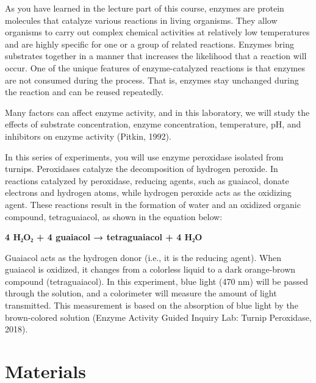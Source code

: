 \documentclass[
  letterpaper,
  DIV=11,
  numbers=noendperiod]{scrreprt}
\begin{document}
As you have learned in the lecture part of this course, enzymes are
protein molecules that catalyze various reactions in living organisms.
They allow organisms to carry out complex chemical activities at
relatively low temperatures and are highly specific for one or a group
of related reactions. Enzymes bring substrates together in a manner that
increases the likelihood that a reaction will occur. One of the unique
features of enzyme-catalyzed reactions is that enzymes are not consumed
during the process. That is, enzymes stay unchanged during the reaction
and can be reused repeatedly.

Many factors can affect enzyme activity, and in this laboratory, we will
study the effects of substrate concentration, enzyme concentration,
temperature, pH, and inhibitors on enzyme activity (Pitkin, 1992).

In this series of experiments, you will use enzyme peroxidase isolated
from turnips. Peroxidases catalyze the decomposition of hydrogen
peroxide. In reactions catalyzed by peroxidase, reducing agents, such as
guaiacol, donate electrons and hydrogen atoms, while hydrogen peroxide
acts as the oxidizing agent. These reactions result in the formation of
water and an oxidized organic compound, tetraguaiacol, as shown in the
equation below:

\textbf{4 H₂O₂ + 4 guaiacol → tetraguaiacol + 4 H₂O}

Guaiacol acts as the hydrogen donor (i.e., it is the reducing agent).
When guaiacol is oxidized, it changes from a colorless liquid to a dark
orange-brown compound (tetraguaiacol). In this experiment, blue light
(470 nm) will be passed through the solution, and a colorimeter will
measure the amount of light transmitted. This measurement is based on
the absorption of blue light by the brown-colored solution (Enzyme
Activity Guided Inquiry Lab: Turnip Peroxidase, 2018).

\section{\texorpdfstring{\textbf{Materials}}{Materials}}\label{materials-1}
\end{document}

